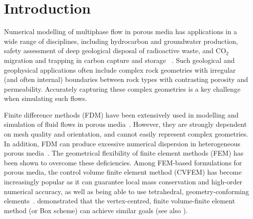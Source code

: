 \documentclass[times]{fldauth}
\begin{document}

\maketitle

\vspace{-6pt}

\section{Introduction}
\vspace{-2pt}

Numerical modelling of multiphase flow in porous media has applications in a wide range of disciplines, including hydrocarbon and groundwater production, safety assessment of deep geological disposal of radioactive waste, and CO$_{\text{2}}$ migration and trapping in carbon capture and storage ~\cite{chen_2006, aiea_1999, pruess_1990c,jiang_2011}. Such geological and geophysical applications often include complex rock geometries with irregular (and often internal) boundaries between rock types with contrasting porosity and permeability.  Accurately capturing these complex geometries is a key challenge when simulating such flows.

Finite difference methods (FDM) have been extensively used in modelling and simulation of fluid flows in porous media~\cite{aziz_1986, chen_1997, chen_2005}.  However, they are strongly dependent on mesh quality and orientation, and cannot easily represent complex geometries. In addition, FDM can produce excessive numerical dispersion in heterogeneous porous media~\cite{chavent_1986}. The geometrical flexibility of finite element methods (FEM) has been shown to overcome these deficiencies. Among FEM-based formulations for porous media, the control volume finite element method (CVFEM) has become increasingly popular as it can guarantee local mass conservation and high-order numerical accuracy, as well as being able to use tetrahedral, geometry-conforming elements~\cite{forsyth_1990,cordazzo_2004, geiger_2004, hurtado_2007}. \cite{huber_2000} demonstrated that the vertex-centred, finite volume-finite element method (or Box scheme) can achieve similar goals (see also \cite{helmig_1997}).
\end{document}
